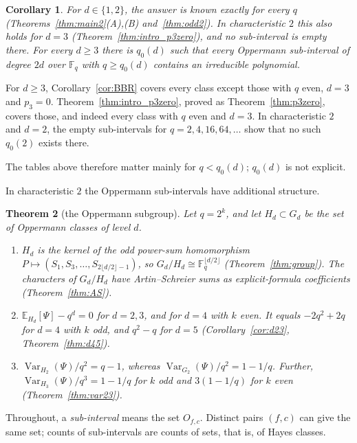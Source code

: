 \documentclass[11pt,a4paper]{amsart}
\newtheorem{theorem}{Theorem}[section]
\newtheorem{corollary}[theorem]{Corollary}
\theoremstyle{definition}
\theoremstyle{remark}
\newcommand{\F}{\mathbb{F}}
\newcommand{\E}{\mathbb{E}}
\newcommand{\Var}{\operatorname{Var}}
\begin{document}
\begin{corollary}\label{cor:largeq}
For $d\in\{1,2\}$, the answer is known exactly for every $q$ (Theorems~\ref{thm:main2}(A),(B) and~\ref{thm:odd2}).
In characteristic $2$ this also holds for $d=3$ (Theorem~\ref{thm:intro_p3zero}), and no sub-interval is empty there.
For every $d\ge3$ there is $q_0(d)$ such that every Oppermann sub-interval of degree $2d$ over $\F_q$ with
$q\ge q_0(d)$ contains an irreducible polynomial.
\end{corollary}

For $d\ge3$, Corollary~\ref{cor:BBR} covers every class except those with $q$ even, $d=3$ and $p_3=0$.
Theorem~\ref{thm:intro_p3zero}, proved as Theorem~\ref{thm:p3zero}, covers those, and indeed every class with $q$
even and $d=3$. In characteristic $2$ and $d=2$, the
empty sub-intervals for $q=2,4,16,64,\dots$ show that no such $q_0(2)$ exists there.

The tables above therefore matter mainly for $q<q_0(d)$; $q_0(d)$ is not explicit.

In characteristic $2$ the Oppermann sub-intervals have additional structure.

\begin{theorem}[the Oppermann subgroup]\label{thm:summary}
Let $q=2^k$, and let $H_d\subset G_d$ be the set of Oppermann classes of level $d$.
\begin{enumerate}
\item $H_d$ is the kernel of the odd power-sum homomorphism $P\mapsto(S_1,S_3,\dots,S_{2\lfloor d/2\rfloor-1})$, so
$G_d/H_d\cong\F_q^{\lfloor d/2\rfloor}$ (Theorem~\ref{thm:group}). The characters of $G_d/H_d$ have Artin--Schreier
sums as explicit-formula coefficients (Theorem~\ref{thm:AS}).
\item $\E_{H_d}[\Psi]-q^d=0$ for $d=2,3$, and for $d=4$ with $k$ even. It equals $-2q^2+2q$ for $d=4$ with $k$ odd,
and $q^2-q$ for $d=5$ (Corollary~\ref{cor:d23}, Theorem~\ref{thm:d45}).
\item $\Var_{H_2}(\Psi)/q^2=q-1$, whereas $\Var_{G_2}(\Psi)/q^2=1-1/q$. Further, $\Var_{H_3}(\Psi)/q^3=1-1/q$ for $k$
odd and $3(1-1/q)$ for $k$ even (Theorem~\ref{thm:var23}).
\end{enumerate}
\end{theorem}

Throughout, a \emph{sub-interval} means the set $O_{f,c}$. Distinct pairs $(f,c)$ can give the same set; counts of
sub-intervals are counts of sets, that is, of Hayes classes.
\end{document}
